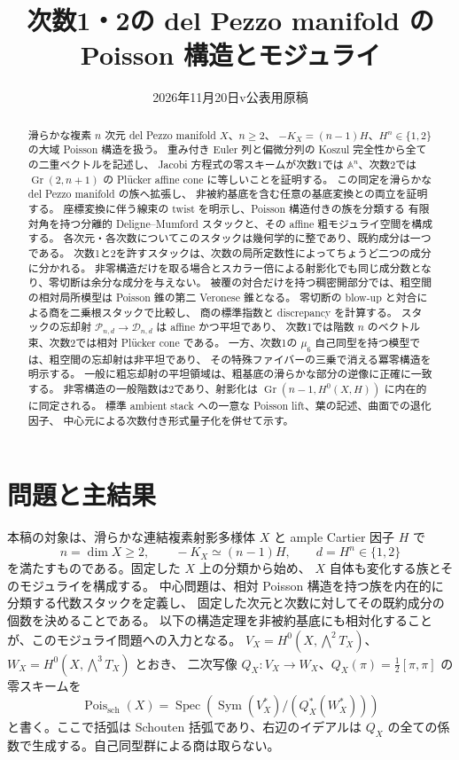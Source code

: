 \documentclass[a4paper,11pt]{ltjsarticle}
\title{次数1・2の del Pezzo manifold の\texorpdfstring{\\}{ }Poisson 構造とモジュライ}
\author{}
\date{2026年11月20日\quad v\Version\quad 公表用原稿}
\numberwithin{equation}{section}
\theoremstyle{plain}
\theoremstyle{definition}
\newcommand{\Pois}{\operatorname{Pois}}
\begin{document}
\maketitle
\begin{abstract}
滑らかな複素 $n$ 次元 del Pezzo manifold $X$、$n\geq2$、
$-K_X=(n-1)H$、$H^n\in\{1,2\}$ の大域 Poisson 構造を扱う。
重み付き Euler 列と偏微分列の Koszul 完全性から全ての二重ベクトルを記述し、
Jacobi 方程式の零スキームが次数1では $\mathbb A^n$、次数2では
$\operatorname{Gr}(2,n+1)$ の Pl\"ucker affine cone に等しいことを証明する。
この同定を滑らかな del Pezzo manifold の族へ拡張し、
非被約基底を含む任意の基底変換との両立を証明する。
座標変換に伴う線束の twist を明示し、Poisson 構造付きの族を分類する
有限対角を持つ分離的 Deligne--Mumford スタックと、その affine 粗モジュライ空間を構成する。
各次元・各次数についてこのスタックは幾何学的に整であり、既約成分は一つである。
次数1と2を許すスタックは、次数の局所定数性によってちょうど二つの成分に分かれる。
非零構造だけを取る場合とスカラー倍による射影化でも同じ成分数となり、零切断は余分な成分を与えない。
被覆の対合だけを持つ稠密開部分では、粗空間の相対局所模型は
Poisson 錐の第二 Veronese 錐となる。
零切断の blow-up と対合による商を二乗根スタックで比較し、
商の標準指数と discrepancy を計算する。
スタックの忘却射 $\mathcal P_{n,d}\to\mathcal D_{n,d}$ は affine かつ平坦であり、
次数1では階数 $n$ のベクトル束、次数2では相対 Pl\"ucker cone である。
一方、次数1の $\mu_6$ 自己同型を持つ模型では、粗空間の忘却射は非平坦であり、
その特殊ファイバーの三乗で消える冪零構造を明示する。
一般に粗忘却射の平坦領域は、粗基底の滑らかな部分の逆像に正確に一致する。
非零構造の一般階数は2であり、射影化は
$\operatorname{Gr}(n-1,H^0(X,H))$ に内在的に同定される。
標準 ambient stack への一意な Poisson lift、葉の記述、曲面での退化因子、
中心元による次数付き形式量子化を併せて示す。
\end{abstract}
\tableofcontents

\section{問題と主結果}
\label{sec:introduction}
本稿の対象は、滑らかな連結複素射影多様体 $X$ と ample Cartier 因子 $H$ で
\[
 n=\dim X\geq2,\qquad -K_X\simeq(n-1)H,\qquad d=H^n\in\{1,2\}
\]
を満たすものである。固定した $X$ 上の分類から始め、
$X$ 自体も変化する族とそのモジュライを構成する。
中心問題は、相対 Poisson 構造を持つ族を内在的に分類する代数スタックを定義し、
固定した次元と次数に対してその既約成分の個数を決めることである。
以下の構造定理を非被約基底にも相対化することが、このモジュライ問題への入力となる。
$V_X=H^0(X,\bigwedge^2T_X)$、$W_X=H^0(X,\bigwedge^3T_X)$ とおき、
二次写像 $Q_X:V_X\to W_X$、$Q_X(\pi)=\frac12[\pi,\pi]$ の零スキームを
\[
 \Pois_{\mathrm{sch}}(X)=
 \operatorname{Spec}\!\left(\operatorname{Sym}(V_X^*)/
       (Q_X^*(W_X^*))\right)
\]
と書く。ここで括弧は Schouten 括弧であり、右辺のイデアルは
$Q_X$ の全ての係数で生成する。自己同型群による商は取らない。
\end{document}

